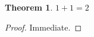 \documentclass{article}
\newtheorem{theorem}{Theorem}
\begin{document}
\begin{theorem}$1 + 1 = 2$\end{theorem}
\begin{proof}Immediate.\end{proof}
\end{document}
